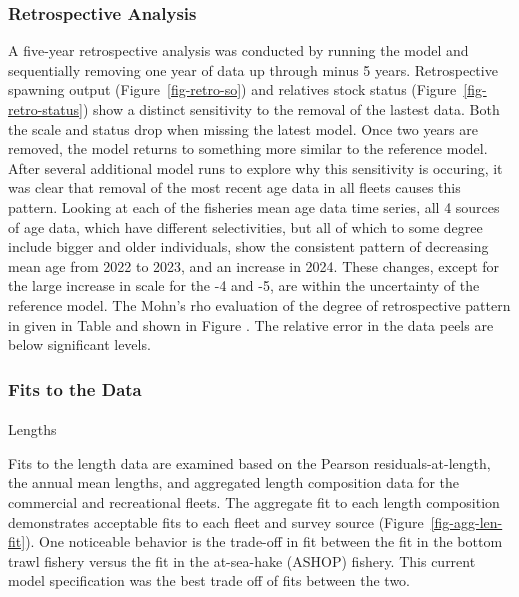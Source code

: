 \documentclass[
]{scrartcl}
\makeatletter
\let\oldparagraph\paragraph
\renewcommand{\paragraph}{
    \@ifstar
      \xxxParagraphStar
      \xxxParagraphNoStar
  }
\newcommand{\xxxParagraphStar}[1]{\oldparagraph*{#1}\mbox{}}
\newcommand{\xxxParagraphNoStar}[1]{\oldparagraph{#1}\mbox{}}
\makeatother
\begin{document}
\subsubsection{Retrospective Analysis}\label{retrospective-analysis}

A five-year retrospective analysis was conducted by running the model
and sequentially removing one year of data up through minus 5 years.
Retrospective spawning output (Figure~\ref{fig-retro-so}) and relatives
stock status (Figure~\ref{fig-retro-status}) show a distinct sensitivity
to the removal of the lastest data. Both the scale and status drop when
missing the latest model. Once two years are removed, the model returns
to something more similar to the reference model. After several
additional model runs to explore why this sensitivity is occuring, it
was clear that removal of the most recent age data in all fleets causes
this pattern. Looking at each of the fisheries mean age data time
series, all 4 sources of age data, which have different selectivities,
but all of which to some degree include bigger and older individuals,
show the consistent pattern of decreasing mean age from 2022 to 2023,
and an increase in 2024. These changes, except for the large increase in
scale for the -4 and -5, are within the uncertainty of the reference
model. The Mohn's rho evaluation of the degree of retrospective pattern
in given in Table and shown in Figure . The relative error in the data
peels are below significant levels.

\subsubsection{Fits to the Data}\label{fits-to-the-data}

\paragraph{Lengths}\label{lengths}

Fits to the length data are examined based on the Pearson
residuals-at-length, the annual mean lengths, and aggregated length
composition data for the commercial and recreational fleets. The
aggregate fit to each length composition demonstrates acceptable fits to
each fleet and survey source (Figure~\ref{fig-agg-len-fit}). One
noticeable behavior is the trade-off in fit between the fit in the
bottom trawl fishery versus the fit in the at-sea-hake (ASHOP) fishery.
This current model specification was the best trade off of fits between
the two.
\end{document}
